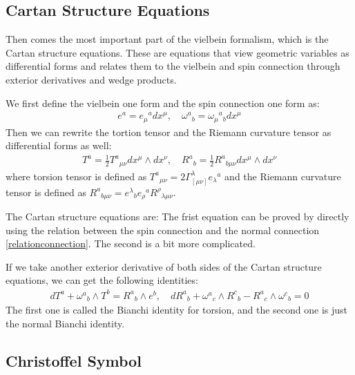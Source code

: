 \subsection{Cartan Structure Equations}

Then comes the most important part of the vielbein formalism, which
is the Cartan structure equations. These are equations that view
geometric variables as differential forms and relates them to the
vielbein and spin connection through exterior derivatives and wedge products.

We first define the vielbein one form and the spin connection one form as:
\begin{align}
  e^a = e_\mu{}^a dx^\mu, \quad \omega^a{}_b = \omega_\mu{}^a{}_b dx^\mu
\end{align}
Then we can rewrite the tortion tensor and the Riemann curvature
tensor as differential forms as well:
\begin{align}
  T^a = \frac{1}{2} T^a{}_{\mu\nu} dx^\mu \wedge dx^\nu, \quad R^a{}_b =
  \frac{1}{2} R^a{}_{b\mu\nu} dx^\mu \wedge dx^\nu
\end{align}
where torsion tensor is defined as $ T^a{}_{\mu\nu} = 2
\Gamma^\lambda_{[\mu\nu]} e_\lambda{}^a $ and the Riemann curvature
tensor is defined as $ R^a{}_{b\mu\nu} = e^\lambda{}_b e_\rho{}^a
R^\rho{}_{\lambda\mu\nu} $.

The Cartan structure equations are:
The frist equation can be proved by directly using the relation
between the spin connection and the normal connection \cref{relationconnection}.
The second is a bit more complicated.

If we take another exterior derivative of both sides of the Cartan
structure equations, we can get the following identities:
\begin{align}
  dT^a + \omega^a{}_b \wedge T^b = R^a{}_b \wedge e^b, \quad dR^a{}_b +
  \omega^a{}_c \wedge R^c{}_b - R^a{}_c \wedge \omega^c{}_b = 0
\end{align}
The first one is called the Bianchi identity for torsion, and the
second one is just the normal Bianchi identity.

\subsection{Christoffel Symbol}

